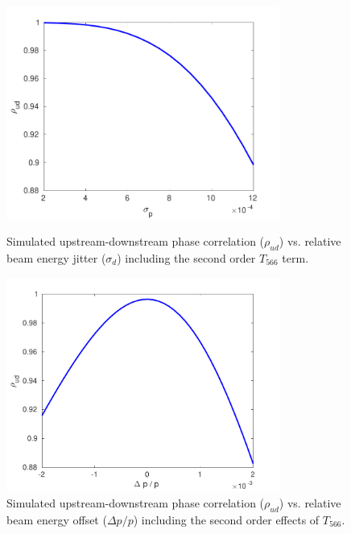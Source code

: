 \begin{figure}
  \centering
  \includegraphics[width=0.8\textwidth]{Figures/propagation/maxCorrWithT566}
  \caption{Simulated upstream-downstream phase correlation (\(\rho_{ud}\)) vs. relative beam energy jitter (\(\sigma_d\)) including the second order \(T_{566}\) term.}
  \label{f:maxCorrWithT566}
  \centering
  \includegraphics[width=0.8\textwidth]{Figures/propagation/corrVsEnergyOffset}
  \caption{Simulated upstream-downstream phase correlation (\(\rho_{ud}\)) vs. relative beam energy offset (\(\Delta p/p\)) including the second order effects of \(T_{566}\).}
  \label{f:corrVsEnergyOffset}
\end{figure}

